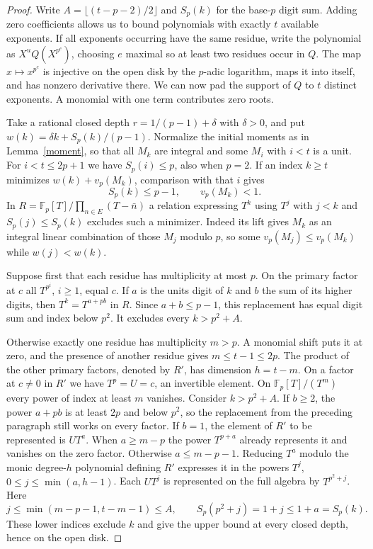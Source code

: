 \documentclass[11pt]{article}
\begin{document}
\begin{proof}
Write $A=\lfloor(t-p-2)/2\rfloor$ and $S_p(k)$ for the base-$p$ digit sum.
Adding zero coefficients allows us to bound polynomials with exactly $t$ available exponents.
If all exponents occurring have the same residue, write the polynomial as
$X^u Q(X^{p^e})$, choosing $e$ maximal so at least two residues occur in $Q$. The map
$x\mapsto x^{p^e}$ is injective on the open disk by the $p$-adic logarithm, maps it into
itself, and has nonzero derivative there. We can now pad the support of $Q$ to $t$
distinct exponents. A monomial with one term contributes zero roots.

Take a rational closed depth $r=1/(p-1)+\delta$ with $\delta>0$, and put
$w(k)=\delta k+S_p(k)/(p-1)$. Normalize the initial moments as in Lemma~\ref{moment}, so that all $M_k$ are integral and some $M_i$ with $i<t$ is a unit.
For $i<t\le2p+1$ we have $S_p(i)\le p$, also when $p=2$.
If an index $k\ge t$ minimizes $w(k)+v_p(M_k)$, comparison with that $i$ gives
\[
 S_p(k)\le p-1,\qquad v_p(M_k)<1 .
\]
In $R=\mathbb F_p[T]/\prod_{n\in E}(T-\bar n)$ a relation expressing $T^k$ using
$T^j$ with $j<k$ and $S_p(j)\le S_p(k)$ excludes such a minimizer. Indeed its lift
gives $M_k$ as an integral linear combination of those $M_j$ modulo $p$,
so some $v_p(M_j)\le v_p(M_k)$ while $w(j)<w(k)$.

Suppose first that each residue has multiplicity at most $p$.
On the primary factor at $c$ all $T^{p^i}$, $i\ge1$, equal $c$.
If $a$ is the units digit of $k$ and $b$ the sum of its higher digits, then
$T^k=T^{a+pb}$ in $R$. Since $a+b\le p-1$, this replacement has equal digit sum
and index below $p^2$. It excludes every $k>p^2+A$.

Otherwise exactly one residue has multiplicity $m>p$. A monomial shift puts it at
zero, and the presence of another residue gives $m\le t-1\le2p$.
The product of the other primary factors, denoted by $R'$, has dimension $h=t-m$.
On a factor at $c\ne0$ in $R'$ we have $T^p=U=c$, an invertible element.
On $\mathbb F_p[T]/(T^m)$ every power of index at least $m$ vanishes.
Consider $k>p^2+A$. If $b\ge2$, the power $a+pb$ is at least $2p$ and below $p^2$,
so the replacement from the preceding paragraph still works on every factor.
If $b=1$, the element of $R'$ to be represented is $UT^a$.
When $a\ge m-p$ the power $T^{p+a}$ already represents it and vanishes on the zero
factor. Otherwise $a\le m-p-1$. Reducing $T^a$ modulo the monic degree-$h$
polynomial defining $R'$ expresses it in the powers $T^j$, $0\le j\le\min(a,h-1)$.
Each $UT^j$ is represented on the full algebra by $T^{p^2+j}$. Here
\[
 j\le\min(m-p-1,t-m-1)\le A,\qquad
 S_p(p^2+j)=1+j\le1+a=S_p(k).
\]
These lower indices exclude $k$ and give the upper bound at every closed depth,
hence on the open disk.


\end{proof}
\end{document}
